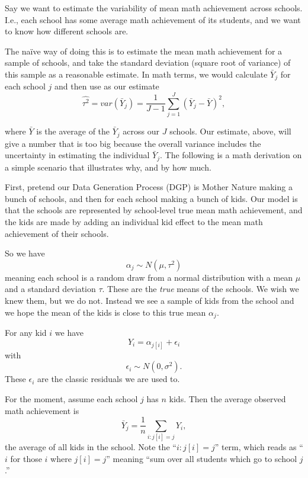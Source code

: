 \documentclass[
  letterpaper,
  DIV=11,
  numbers=noendperiod]{scrreprt}
\begin{document}
Say we want to estimate the variability of mean math achievement across
schools. I.e., each school has some average math achievement of its
students, and we want to know how different schools are.

The naïve way of doing this is to estimate the mean math achievement for
a sample of schools, and take the standard deviation (square root of
variance) of this sample as a reasonable estimate. In math terms, we
would calculate \(\bar{Y}_j\) for each school \(j\) and then use as our
estimate
\[\widehat{\tau^2} = var( \bar{Y}_j ) = \frac{1}{J-1} \sum_{j=1}^J (\bar{Y}_j - \bar{Y})^2,\]

where \(\bar{Y}\) is the average of the \(\bar{Y}_j\) across our \(J\)
schools. Our estimate, above, will give a number that is too big because
the overall variance includes the uncertainty in estimating the
individual \(\bar{Y}_j\). The following is a math derivation on a simple
scenario that illustrates why, and by how much.

First, pretend our Data Generation Process (DGP) is Mother Nature making
a bunch of schools, and then for each school making a bunch of kids. Our
model is that the schools are represented by school-level true mean math
achievement, and the kids are made by adding an individual kid effect to
the mean math achievement of their schools.

So we have \[\alpha_j \sim N( \mu, \tau^2 )\] meaning each school is a
random draw from a normal distribution with a mean \(\mu\) and a
standard deviation \(\tau\). These are the \emph{true} means of the
schools. We wish we knew them, but we do not. Instead we see a sample of
kids from the school and we hope the mean of the kids is close to this
true mean \(\alpha_j\).

For any kid \(i\) we have \[Y_i  = \alpha_{j[i]} + \epsilon_i\] with
\[\epsilon_i \sim N( 0, \sigma^2 ).\] These \(\epsilon_i\) are the
classic residuals we are used to.

For the moment, assume each school \(j\) has \(n\) kids. Then the
average observed math achievement is
\[\bar{Y}_j = \frac{1}{n} \sum_{i : j[i] = j} Y_i ,\] the average of all
kids in the school. Note the ``\(i : j[i] = j\)'' term, which reads as
``\(i\) for those \(i\) where \(j[i] = j\)'' meaning ``sum over all
students which go to school \(j\).''
\end{document}
